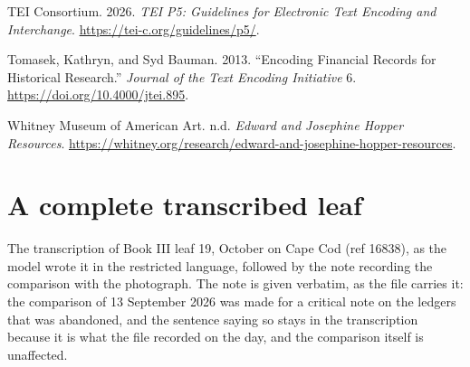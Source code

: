 \documentclass[11pt]{article}
\newcommand{\qq}[1]{“#1”}
\begin{document}
\begin{list}{}{\setlength{\leftmargin}{1.5em}\setlength{\itemindent}{-1.5em}\setlength{\itemsep}{3pt}}
\item TEI Consortium. 2026. \emph{TEI P5: Guidelines for Electronic Text Encoding and Interchange}. \url{https://tei-c.org/guidelines/p5/}.
\item Tomasek, Kathryn, and Syd Bauman. 2013. \qq{Encoding Financial Records for Historical Research.} \emph{Journal of the Text Encoding Initiative} 6. \url{https://doi.org/10.4000/jtei.895}.
\item Whitney Museum of American Art. n.d. \emph{Edward and Josephine Hopper Resources}. \url{https://whitney.org/research/edward-and-josephine-hopper-resources}.
\end{list}

\appendix
\section{A complete transcribed leaf}

The transcription of Book III leaf 19, October on Cape Cod (ref 16838), as the model wrote it in the restricted language, followed by the note recording the comparison with the photograph. The note is given verbatim, as the file carries it: the comparison of 13 September 2026 was made for a critical note on the ledgers that was abandoned, and the sentence saying so stays in the transcription because it is what the file recorded on the day, and the comparison itself is unaffected.
\end{document}
